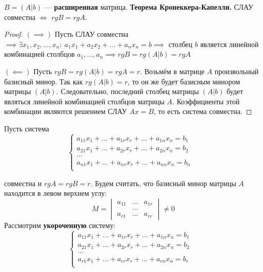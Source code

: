 $B = (A|b)$ --- \textbf{расширенная} матрица.
\newline
\textbf{Теорема Кронеккера-Капелли.} СЛАУ совместна $\iff$ $rgB = rgA$.

    \begin{proof}
    $(\implies)$ Пусть СЛАУ совместна $\implies \exists x_1, x_2, \dots, x_n:~a_1x_1 + a_2x_2 + \dots + a_nx_n = b \implies$ столбец $b$ является линейной комбинацией столбцов $a_1,\dots,a_n \implies rgB=rg(A|b) = rgA$
    
    $(\impliedby)$ Пусть $rgB = rg(A|b) = rgA = r$. Возьмём в матрице $A$ произвольный базисный минор. Так как $rg(A|b) = r$, то он же будет базисным минором матрицы $(A|b)$. Следовательно, последний столбец матрицы $(A|b)$ будет являться линейной комбинацией столбцов матрицы $A$. Коэффициенты этой комбинации являются решением СЛАУ $Ax=B$, то есть система совместна.
    \end{proof}

Пусть система
$$\begin{cases}
        a_{11}x_1+\dots + a_{1r}x_r+\dots+a_{1n}x_n = b_1&\\
        a_{21}x_1+\dots + a_{2r}x_r+\dots+a_{2n}x_n = b_2&\\
        \dots&\\
        a_{n1}x_1+\dots + a_{nr}x_r+\dots+a_{nn}x_n = b_n&\\
    \end{cases}$$

совместна и $rgA = rgB = r$. Будем считать, что базисный минор матрицы $A$ находится в левом верхнем углу:
$$M = \begin{vmatrix}
          a_{11} & \dots & a_{1r}\\
          & \dots & \\
          a_{r1} & \dots & a_{rr}
    \end{vmatrix} \neq 0 $$
Рассмотрим \textbf{укороченную} систему:
\begin{equation}
    \begin{cases}
        a_{11}x_1+\dots + a_{1r}x_r+\dots+a_{1n}x_n = b_1&\\
        a_{21}x_1+\dots + a_{2r}x_r+\dots+a_{2n}x_n = b_2&\\
        \dots&\\
        a_{r1}x_1+\dots + a_{rr}x_r+\dots+a_{rn}x_n = b_r&\\
    \end{cases}
    \label{eq1}
\end{equation}

